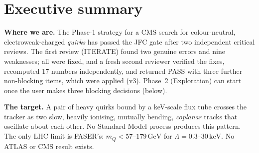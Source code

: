 \documentclass[11pt,a4paper]{article}
\newcommand{\mQ}{m_Q}
\newcommand{\GeV}{\,\mathrm{GeV}}
\newcommand{\keV}{\,\mathrm{keV}}
\begin{document}
\section*{Executive summary}
\vspace{-4pt}
{\small
\begin{key}
\textbf{Where we are.} The Phase-1 strategy for a CMS search for colour-neutral, electroweak-charged \emph{quirks} has passed the JFC gate after two independent critical reviews. The first review (ITERATE) found two genuine errors and nine weaknesses; all were fixed, and a fresh second reviewer verified the fixes, recomputed 17 numbers independently, and returned PASS with three further non-blocking items, which were applied (v3). Phase~2 (Exploration) can start once the user makes three blocking decisions (below).
\end{key}

\textbf{The target.} A pair of heavy quirks bound by a keV-scale flux tube crosses the tracker as two slow, heavily ionising, mutually bending, \emph{coplanar} tracks that oscillate about each other. No Standard-Model process produces this pattern. The only LHC limit is FASER's: $\mQ<57$--$179\GeV$ for $\Lambda=0.3$--$30\keV$. No ATLAS or CMS result exists.

}
\end{document}
